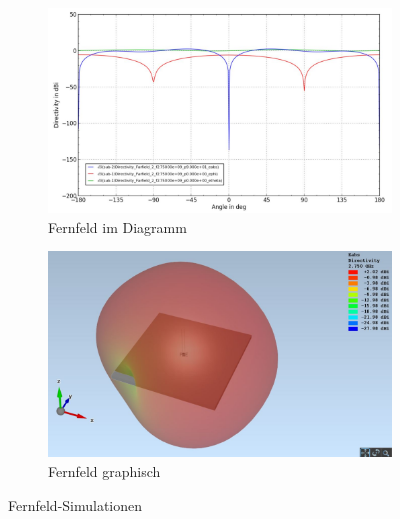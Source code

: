 \begin{figure}[htbp]
	\begin{center}
		\begin{subfigure}[t]{0.49\textwidth}
			\begin{center}
				\includegraphics[width=\textwidth]{pic/Simulationen/Simulation_Farfield_dia.JPG}
				\caption{Fernfeld im Diagramm}
				\label{fig:Farfield_dia}
			\end{center}
		\end{subfigure}
		\begin{subfigure}[t]{0.49\textwidth}
			\begin{center}
				\includegraphics[width=\textwidth]{pic/Simulationen/Simulation_Farfield.JPG}
				\caption{Fernfeld graphisch}
				\label{fig:Farfield_graph}
			\end{center}
		\end{subfigure}
		\caption{Fernfeld-Simulationen}
		\label{fig:Simulationen_2}
	\end{center}
\end{figure}

